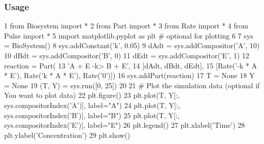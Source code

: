 \subsubsection*{Usage }


\begin{DoxyCode}
1 from Biosystem import *
2 from Part import *
3 from Rate import *
4 from Pulse import *
5 import matplotlib.pyplot as plt # optional for plotting
6 
7 sys = BioSystem()
8 sys.addConstant('k', 0.05)
9 dAdt = sys.addCompositor('A', 10)
10 dBdt = sys.addCompositor('B', 0)
11 dEdt = sys.addCompositor('E', 1)
12 reaction  = Part(
13 'A + E -k> B + E',
14 [dAdt, dBdt, dEdt],
15 [Rate('-k * A * E'), Rate('k * A * E'), Rate('0')])
16 sys.addPart(reaction)
17 T = None
18 Y = None
19 (T, Y) = sys.run([0, 25])
20 
21 # Plot the simulation data (optional if You want to plot data)
22 plt.figure()
23 plt.plot(T, Y[:, sys.compositorIndex('A')], label="A")
24 plt.plot(T, Y[:, sys.compositorIndex('B')], label="B")
25 plt.plot(T, Y[:, sys.compositorIndex('E')], label="E")
26 plt.legend()
27 plt.xlabel('Time')
28 plt.ylabel('Concentration')
29 plt.show()
\end{DoxyCode}
 